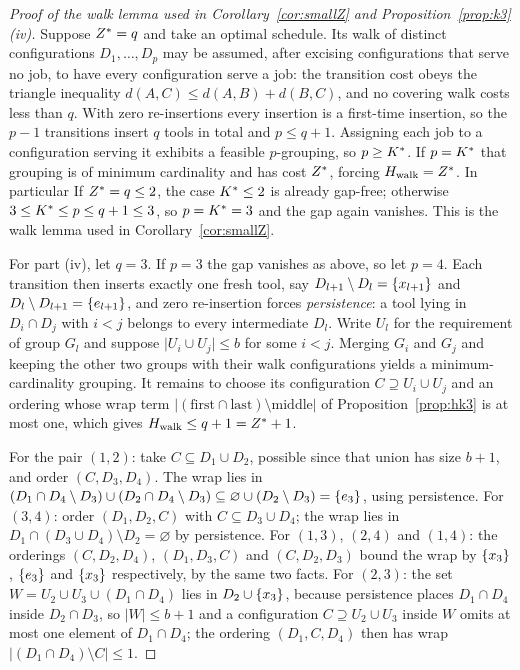 \begin{proof}[Proof of the walk lemma used in Corollary~\ref{cor:smallZ} and
Proposition~\ref{prop:k3}(iv)]
Suppose $Z^{\ast}=q$ and take an optimal schedule. Its walk of distinct configurations
$D_1,\dots,D_p$ may be assumed, after excising configurations that serve no job, to
have every configuration serve a job: the transition cost obeys the triangle
inequality $d(A,C)\le d(A,B)+d(B,C)$, and no covering walk costs less than $q$. With
zero re-insertions every insertion is a first-time insertion, so the $p-1$ transitions
insert $q$ tools in total and $p\le q+1$. Assigning each job to a configuration
serving it exhibits a feasible $p$-grouping, so $p\ge K^{\ast}$. If $p=K^{\ast}$ that grouping
is of minimum cardinality and has cost $Z^{\ast}$, forcing $H_{\mathrm{walk}}=Z^{\ast}$. In particular
  If $Z^{\ast}=q\le2$, the case $K^{\ast}\le2$ is already gap-free; otherwise
  $3\le K^{\ast}\le p\le q+1\le3$, so $p=K^{\ast}=3$ and the gap again vanishes. This is the
  walk lemma used in Corollary~\ref{cor:smallZ}.

For part (iv), let $q=3$. If $p=3$ the gap vanishes as above, so let $p=4$. Each
transition then inserts exactly one fresh tool, say $D_{l+1}\setminus D_l=\{x_{l+1}\}$
and $D_l\setminus D_{l+1}=\{e_{l+1}\}$, and zero re-insertion forces
\emph{persistence}: a tool lying in $D_i\cap D_j$ with $i<j$ belongs to every
intermediate $D_l$. Write $U_l$ for the requirement of group $G_l$ and suppose
$\lvert U_i\cup U_j\rvert\le b$ for some $i<j$. Merging $G_i$ and $G_j$ and keeping the
other two groups with their walk configurations yields a minimum-cardinality grouping.
It remains to choose its configuration $C\supseteq U_i\cup U_j$ and an ordering whose
wrap term $\lvert(\text{first}\cap\text{last})\setminus\text{middle}\rvert$ of
Proposition~\ref{prop:hk3} is at most one, which gives $H_{\mathrm{walk}}\le q+1=Z^{\ast}+1$.

For the pair $(1,2)$: take $C\subseteq D_1\cup D_2$, possible since that union has size
$b+1$, and order $(C,D_3,D_4)$. The wrap lies in
$(D_1\cap D_4\setminus D_3)\cup(D_2\cap D_4\setminus D_3)\subseteq\varnothing\cup(D_2\setminus D_3)=\{e_3\}$,
using persistence. For $(3,4)$: order $(D_1,D_2,C)$ with $C\subseteq D_3\cup D_4$; the
wrap lies in $D_1\cap(D_3\cup D_4)\setminus D_2=\varnothing$ by persistence. For
$(1,3)$, $(2,4)$ and $(1,4)$: the orderings $(C,D_2,D_4)$, $(D_1,D_3,C)$ and
$(C,D_2,D_3)$ bound the wrap by $\{x_3\}$, $\{e_3\}$ and $\{x_3\}$
respectively, by the same two facts. For $(2,3)$: the set
$W=U_2\cup U_3\cup(D_1\cap D_4)$ lies in $D_2\cup\{x_3\}$, because persistence
places $D_1\cap D_4$ inside $D_2\cap D_3$, so $\lvert W\rvert\le b+1$ and a
configuration $C\supseteq U_2\cup U_3$ inside $W$ omits at most one element of
$D_1\cap D_4$; the ordering $(D_1,C,D_4)$ then has wrap
$\lvert(D_1\cap D_4)\setminus C\rvert\le1$.
\end{proof}

